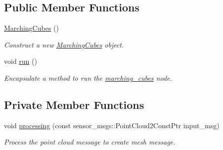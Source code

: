 \subsection*{Public Member Functions}
\begin{DoxyCompactItemize}
\item 
\hyperlink{classmarching__cubes_1_1_marching_cubes_a1a953862541f2d2c6a3d6a5056c208b9}{Marching\+Cubes} ()
\begin{DoxyCompactList}\small\item\em Construct a new \hyperlink{classmarching__cubes_1_1_marching_cubes}{Marching\+Cubes} object. \end{DoxyCompactList}\item 
void \hyperlink{classmarching__cubes_1_1_marching_cubes_aad8747fa8bd083aa939873d98814966e}{run} ()
\begin{DoxyCompactList}\small\item\em Encapsulate a method to run the \hyperlink{namespacemarching__cubes}{marching\+\_\+cubes} node. \end{DoxyCompactList}\end{DoxyCompactItemize}
\subsection*{Private Member Functions}
\begin{DoxyCompactItemize}
\item 
void \hyperlink{classmarching__cubes_1_1_marching_cubes_a7d81fc975a0a768a175af838cd4fbc86}{processing} (const sensor\+\_\+msgs\+::\+Point\+Cloud2\+Const\+Ptr input\+\_\+msg)
\begin{DoxyCompactList}\small\item\em Process the point cloud message to create mesh message. \end{DoxyCompactList}\end{DoxyCompactItemize}
